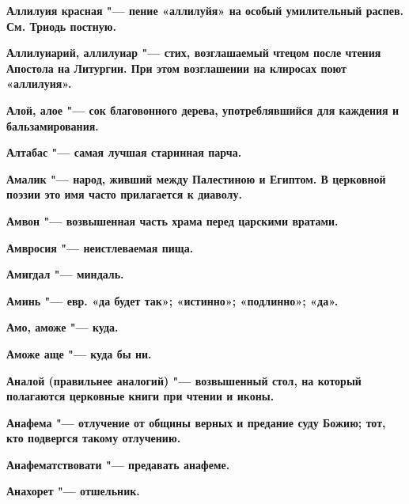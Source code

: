 \begin{multicols}{2}
\bfseries Аллилуия красная\normalfont{} "--- пение «аллилуйя» на особый умилительный распев. См. Триодь постную. 




\bfseries Аллилуиарий, аллилуиар\normalfont{} "--- стих, возглашаемый чтецом после чтения Апостола на Литургии. При этом возглашении на клиросах поют «аллилуия». 




\bfseries Алой, алое\normalfont{} "--- сок благовонного дерева, употреблявшийся для каждения и бальзамирования. 




\bfseries Алтабас\normalfont{} "--- самая лучшая старинная парча. 




\bfseries Амалик\normalfont{} "--- народ, живший между Палестиною и Египтом. В церковной поэзии это имя часто прилагается к диаволу. 




\bfseries Амвон\normalfont{} "--- возвышенная часть храма перед царскими вратами. 




\bfseries Амвросия\normalfont{} "--- неистлеваемая пища. 




\bfseries Амигдал\normalfont{} "--- миндаль. 




\bfseries Аминь\normalfont{} "--- евр. «да будет так»; «истинно»; «подлинно»; «да». 




\bfseries Амо, аможе\normalfont{} "--- куда. 




\bfseries Аможе аще\normalfont{} "--- куда бы ни. 




\bfseries Аналой\normalfont{} (правильнее \bfseries аналогий\normalfont{}) "--- возвышенный стол, на который полагаются церковные книги при чтении и иконы. 




\bfseries Анафема\normalfont{} "--- отлучение от общины верных и предание суду Божию; тот, кто подвергся такому отлучению. 




\bfseries Анафематствовати\normalfont{} "--- предавать анафеме. 




\bfseries Анахорет\normalfont{} "--- отшельник. 





\end{multicols}
